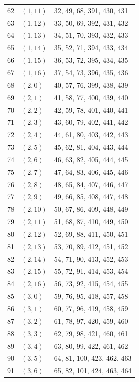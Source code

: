 \documentclass{article}
\begin{document}
\begin{longtable}{lll}
  62 & \((1, 11)\) & 32, 49, 68, 391, 430, 431 \\
  63 & \((1, 12)\) & 33, 50, 69, 392, 431, 432 \\
  64 & \((1, 13)\) & 34, 51, 70, 393, 432, 433 \\
  65 & \((1, 14)\) & 35, 52, 71, 394, 433, 434 \\
  66 & \((1, 15)\) & 36, 53, 72, 395, 434, 435 \\
  67 & \((1, 16)\) & 37, 54, 73, 396, 435, 436 \\
  68 & \((2, 0)\) & 40, 57, 76, 399, 438, 439 \\
  69 & \((2, 1)\) & 41, 58, 77, 400, 439, 440 \\
  70 & \((2, 2)\) & 42, 59, 78, 401, 440, 441 \\
  71 & \((2, 3)\) & 43, 60, 79, 402, 441, 442 \\
  72 & \((2, 4)\) & 44, 61, 80, 403, 442, 443 \\
  73 & \((2, 5)\) & 45, 62, 81, 404, 443, 444 \\
  74 & \((2, 6)\) & 46, 63, 82, 405, 444, 445 \\
  75 & \((2, 7)\) & 47, 64, 83, 406, 445, 446 \\
  76 & \((2, 8)\) & 48, 65, 84, 407, 446, 447 \\
  77 & \((2, 9)\) & 49, 66, 85, 408, 447, 448 \\
  78 & \((2, 10)\) & 50, 67, 86, 409, 448, 449 \\
  79 & \((2, 11)\) & 51, 68, 87, 410, 449, 450 \\
  80 & \((2, 12)\) & 52, 69, 88, 411, 450, 451 \\
  81 & \((2, 13)\) & 53, 70, 89, 412, 451, 452 \\
  82 & \((2, 14)\) & 54, 71, 90, 413, 452, 453 \\
  83 & \((2, 15)\) & 55, 72, 91, 414, 453, 454 \\
  84 & \((2, 16)\) & 56, 73, 92, 415, 454, 455 \\
  85 & \((3, 0)\) & 59, 76, 95, 418, 457, 458 \\
  86 & \((3, 1)\) & 60, 77, 96, 419, 458, 459 \\
  87 & \((3, 2)\) & 61, 78, 97, 420, 459, 460 \\
  88 & \((3, 3)\) & 62, 79, 98, 421, 460, 461 \\
  89 & \((3, 4)\) & 63, 80, 99, 422, 461, 462 \\
  90 & \((3, 5)\) & 64, 81, 100, 423, 462, 463 \\
  91 & \((3, 6)\) & 65, 82, 101, 424, 463, 464 \\

\end{longtable}
\end{document}
